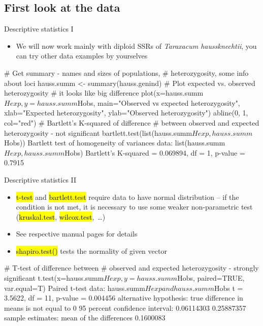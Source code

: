 \documentclass[compress, ucs, xelatex, 11pt, xcolor=svgnames,
  hyperref={
    bookmarks=true,
    unicode=true,
    colorlinks=true,
    pdftitle={Molecular data in R},
    plainpages=false,
    pdfauthor={Vojtech Zeisek},
    pdfsubject={Course about phylogeny and evolution in R},
    pdfcreator={XeLaTeX},
    pdfkeywords={R, evolution, phylogeny, molecular data},
    linkcolor=Tomato,
    anchorcolor=SaddleBrown,
    citecolor=Goldenrod,
    filecolor=DarkMagenta,
    menucolor=Sienna,
    urlcolor=DarkTurquoise,
    pdftex},
  url={hyphens, lowtilde} %
  ]{beamer}
\renewcommand{\texttt}[1]{\hl{\ttfamily #1}}
\begin{document}
\subsection{First look at the data}

\begin{frame}[fragile]{Descriptive statistics I}
  \label{popgenindx}
  \begin{itemize}
    \item We will now work mainly with diploid SSRs of \textit{Taraxacum haussknechtii}, you can try other data examples by yourselves
  \end{itemize}
  \begin{spluscode}
    # Get summary - names and sizes of populations,
    # heterozygosity, some info about loci
    hauss.summ <- summary(hauss.genind)
    # Plot expected vs. observed heterozygosity
    # it looks like big difference
    plot(x=hauss.summ$Hexp, y=hauss.summ$Hobs,
      main="Observed vs expected heterozygosity",
      xlab="Expected heterozygosity", ylab="Observed heterozygosity")
    abline(0, 1, col="red")
    # Bartlett's K-squared of difference
    # between observed and expected heterozygosity - not significant
    bartlett.test(list(hauss.summ$Hexp, hauss.summ$Hobs))
                  Bartlett test of homogeneity of variances
    data:  list(hauss.summ$Hexp, hauss.summ$Hobs)
    Bartlett's K-squared = 0.069894, df = 1, p-value = 0.7915
  \end{spluscode}
\end{frame}

\begin{frame}[fragile]{Descriptive statistics II}
  \begin{itemize}
    \item \texttt{t-test} and \texttt{bartlett.test} require data to have normal distribution -- if the condition is not met, it is necessary to use some weaker non-parametric test (\texttt{kruskal.test}, \texttt{wilcox.test},~\ldots)
    \item See respective manual pages for details
    \item \texttt{shapiro.test()} tests the normality of given vector
  \end{itemize}
  \begin{spluscode}
    # T-test of difference between
    # observed and expected heterozygosity - strongly significant
    t.test(x=hauss.summ$Hexp, y=hauss.summ$Hobs, paired=TRUE, var.equal=T)
                 Paired t-test
    data:  hauss.summ$Hexp and hauss.summ$Hobs
    t = 3.5622, df = 11, p-value = 0.004456
    alternative hypothesis: true difference in means is not equal to 0
    95 percent confidence interval:
     0.06114303 0.25887357
    sample estimates:
    mean of the differences
                  0.1600083
  \end{spluscode}
\end{frame}
\end{document}
